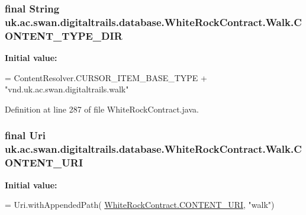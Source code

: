 \hypertarget{classuk_1_1ac_1_1swan_1_1digitaltrails_1_1database_1_1_white_rock_contract_1_1_walk_a85e53becaea8cd11e73df3937bed9243}{
\subsubsection[{C\+O\+N\+T\+E\+N\+T\+\_\+\+T\+Y\+P\+E\+\_\+\+D\+I\+R}]{\setlength{\rightskip}{0pt plus 5cm}final String uk.\+ac.\+swan.\+digitaltrails.\+database.\+White\+Rock\+Contract.\+Walk.\+C\+O\+N\+T\+E\+N\+T\+\_\+\+T\+Y\+P\+E\+\_\+\+D\+I\+R\hspace{0.3cm}{\ttfamily [static]}}}\label{classuk_1_1ac_1_1swan_1_1digitaltrails_1_1database_1_1_white_rock_contract_1_1_walk_a85e53becaea8cd11e73df3937bed9243}
{\bfseries Initial value\+:}
\begin{DoxyCode}
= ContentResolver.CURSOR\_ITEM\_BASE\_TYPE +
                \textcolor{stringliteral}{"vnd.uk.ac.swan.digitaltrails.walk"}
\end{DoxyCode}


Definition at line 287 of file White\+Rock\+Contract.\+java.

\hypertarget{classuk_1_1ac_1_1swan_1_1digitaltrails_1_1database_1_1_white_rock_contract_1_1_walk_a636ef2628c2909ed76334474a941afb2}{
\subsubsection[{C\+O\+N\+T\+E\+N\+T\+\_\+\+U\+R\+I}]{\setlength{\rightskip}{0pt plus 5cm}final Uri uk.\+ac.\+swan.\+digitaltrails.\+database.\+White\+Rock\+Contract.\+Walk.\+C\+O\+N\+T\+E\+N\+T\+\_\+\+U\+R\+I\hspace{0.3cm}{\ttfamily [static]}}}\label{classuk_1_1ac_1_1swan_1_1digitaltrails_1_1database_1_1_white_rock_contract_1_1_walk_a636ef2628c2909ed76334474a941afb2}
{\bfseries Initial value\+:}
\begin{DoxyCode}
= Uri.withAppendedPath(
                \hyperlink{classuk_1_1ac_1_1swan_1_1digitaltrails_1_1database_1_1_white_rock_contract_abfe96759bfe16773a98099536eef2306}{WhiteRockContract.CONTENT\_URI}, \textcolor{stringliteral}{"walk"})
\end{DoxyCode}


